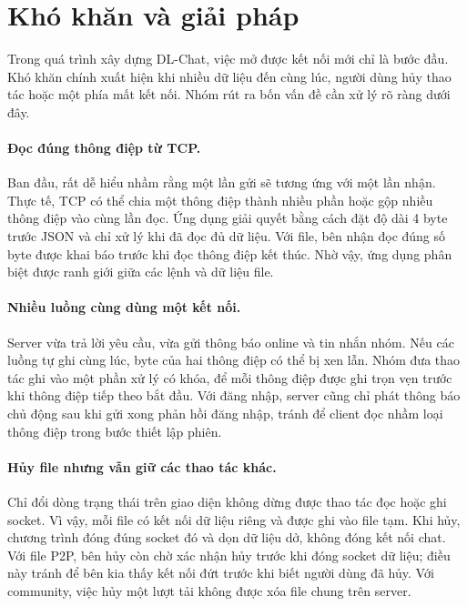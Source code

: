\section{Khó khăn và giải pháp}
\begingroup
\small
{}

Trong quá trình xây dựng DL-Chat, việc mở được kết nối mới chỉ là bước đầu.
Khó khăn chính xuất hiện khi nhiều dữ liệu đến cùng lúc, người dùng hủy thao tác
hoặc một phía mất kết nối. Nhóm rút ra bốn vấn đề cần xử lý rõ ràng dưới đây.

\paragraph{Đọc đúng thông điệp từ TCP.}
Ban đầu, rất dễ hiểu nhầm rằng một lần gửi sẽ tương ứng với một lần nhận.
Thực tế, TCP có thể chia một thông điệp thành nhiều phần hoặc gộp nhiều thông
điệp vào cùng lần đọc. Ứng dụng giải quyết bằng cách đặt độ dài 4 byte trước
JSON và chỉ xử lý khi đã đọc đủ dữ liệu. Với file, bên nhận đọc đúng số byte
được khai báo trước khi đọc thông điệp kết thúc. Nhờ vậy, ứng dụng phân biệt
được ranh giới giữa các lệnh và dữ liệu file.

\paragraph{Nhiều luồng cùng dùng một kết nối.}
Server vừa trả lời yêu cầu, vừa gửi thông báo online và tin nhắn nhóm. Nếu các
luồng tự ghi cùng lúc, byte của hai thông điệp có thể bị xen lẫn. Nhóm đưa thao
tác ghi vào một phần xử lý có khóa, để mỗi thông điệp được ghi trọn vẹn trước
khi thông điệp tiếp theo bắt đầu. Với đăng nhập, server cũng chỉ phát thông báo
chủ động sau khi gửi xong phản hồi đăng nhập, tránh để client đọc nhầm loại
thông điệp trong bước thiết lập phiên.

\paragraph{Hủy file nhưng vẫn giữ các thao tác khác.}
Chỉ đổi dòng trạng thái trên giao diện không dừng được thao tác đọc hoặc ghi
socket. Vì vậy, mỗi file có kết nối dữ liệu riêng và được ghi vào file tạm.
Khi hủy, chương trình đóng đúng socket đó và dọn dữ liệu dở, không đóng kết nối
chat. Với file P2P, bên hủy còn chờ xác nhận hủy trước khi đóng socket dữ liệu;
điều này tránh để bên kia thấy kết nối đứt trước khi biết người dùng đã hủy.
Với community, việc hủy một lượt tải không được xóa file chung trên server.

